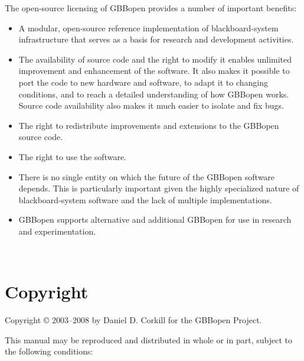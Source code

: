 \documentclass[10pt,twoside,english,pdftex]{article}
\begin{document}
{The open-source licensing of GBBopen provides a number of important benefits:
\begin{itemize}
\item A modular, open-source reference implementation of
  blackboard-system infrastructure that serves as a basis for research
  and development activities.
\item The availability of source code and the right to modify it
  enables unlimited improvement and enhancement of the software. It
  also makes it possible to port the code to new hardware and
  software, to adapt it to changing conditions, and to reach a
  detailed understanding of how GBBopen works. Source code
  availability also makes it much easier to isolate and fix bugs.
\item The right to redistribute improvements and extensions to the
  GBBopen source code.
\item The right to use the software.
\item There is no single entity on which the future of the GBBopen
  software depends. This is particularly important given the highly
  specialized nature of blackboard-system software and the lack of
  multiple implementations.
\item GBBopen supports alternative and additional GBBopen  for
  use in research and experimentation.
\end{itemize}
}%


\T\begin{ifhtml} 
  \intro
  \setcounter{htmlautomenu}{0}
\T\end{ifhtml}

\T\thispagestyle{empty}


\T\newpage
\T~
\T\vfill
\W{}
\W\section*{Copyright}

Copyright \copyright{} 2003--2008 by Daniel D. Corkill for the
GBBopen Project.

This manual may be reproduced and distributed in whole or in
part, subject to the following conditions: 
\end{document}

